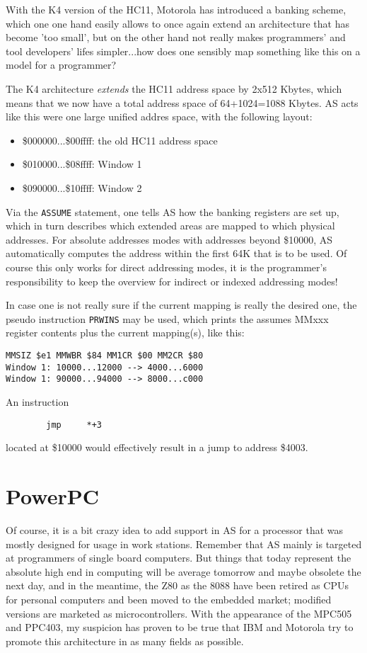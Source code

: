 \documentclass[12pt,twoside]{report}
\begin{document}
With the K4 version  of the HC11, Motorola has introduced a banking
scheme, which one one hand easily allows to once again extend an
architecture that has become 'too small', but on the other hand not really
makes programmers' and tool developers' lifes simpler...how does one
sensibly map something like this on a model for a programmer?

The K4 architecture {\em extends} the HC11 address space by 2x512 Kbytes,
which means that we now have a total address space of 64+1024=1088 Kbytes. 
AS acts like this were one large unified addres space, with the following
layout:
\begin{itemize}
\item{\$000000...\$00ffff: the old HC11 address space}
\item{\$010000...\$08ffff: Window 1}
\item{\$090000...\$10ffff: Window 2}
\end{itemize}
Via the {\tt ASSUME} statement, one tells AS how the banking registers are
set up, which in turn describes which extended areas are mapped to which
physical addresses.  For absolute addresses modes with addresses beyond
\$10000, AS automatically computes the address within the first 64K that
is to be used.  Of course this only works for direct addressing modes, it
is the programmer's responsibility to keep the overview for indirect or
indexed addressing modes!

In case one is not really sure if the current mapping is really the
desired one, the pseudo instruction {\tt PRWINS} may be used, which prints
the assumes MMxxx register contents plus the current mapping(s), like
this:
\begin{verbatim}
MMSIZ $e1 MMWBR $84 MM1CR $00 MM2CR $80
Window 1: 10000...12000 --> 4000...6000
Window 1: 90000...94000 --> 8000...c000
\end{verbatim}
An instruction
\begin{verbatim}
        jmp     *+3
\end{verbatim}
located at \$10000 would effectively result in a jump to address \$4003.


\section{PowerPC}

Of course, it is a bit crazy idea to add support in AS for a
processor that was mostly designed for usage in work stations. 
Remember that AS mainly is targeted at programmers of single board
computers.  But things that today represent the absolute high end in
computing will be average tomorrow and maybe obsolete the next day,
and in the meantime, the Z80 as the 8088 have been retired as CPUs
for personal computers and been moved to the embedded market;
modified versions are marketed as microcontrollers.  With the
appearance of the MPC505 and PPC403, my suspicion has proven to be
true that IBM and Motorola try to promote this architecture in as
many fields as possible.
\end{document}
